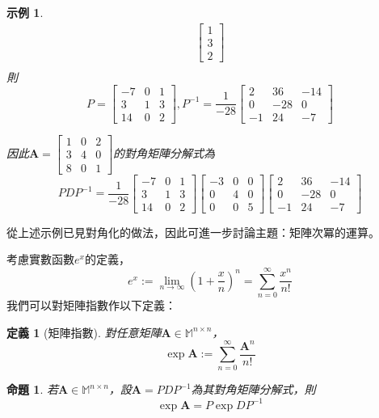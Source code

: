 \documentclass[12pt]{article}
\newtheorem{definition}{定義}
\newtheorem*{proposition}{命題}
\newtheorem*{example}{示例}
\begin{document}
\begin{example}
\begin{align*}
\begin{bmatrix}
                1\\3\\2
            \end{bmatrix}\\
        \end{align*}
        則$$P=\begin{bmatrix}
            -7&0&1\\3&1&3\\14&0&2
        \end{bmatrix},P^{-1}=\frac{1}{-28}\begin{bmatrix}
            2&36&-14\\0&-28&0\\-1&24&-7
        \end{bmatrix}$$

        因此$\mathbf{A}=\begin{bmatrix}
            1&0&2\\3&4&0\\8&0&1
        \end{bmatrix}$的對角矩陣分解式為$$PDP^{-1}=\frac{1}{-28}\begin{bmatrix}
            -7&0&1\\3&1&3\\14&0&2
        \end{bmatrix}\begin{bmatrix}
            -3&0&0\\0&4&0\\0&0&5
        \end{bmatrix}\begin{bmatrix}
            2&36&-14\\0&-28&0\\-1&24&-7
        \end{bmatrix}$$
    \end{example}

    從上述示例已見對角化的做法，因此可進一步討論主題：矩陣次冪的運算。

    考慮實數函數$e^x$的定義，$$e^x:=\lim_{n\to \infty}(1+\frac{x}{n})^n=\sum_{n=0}^{\infty}\frac{x^n}{n!}$$
    我們可以對矩陣指數作以下定義：

    \begin{definition}[矩陣指數]
        對任意矩陣$\mathbf{A}\in\mathbb{M}^{n\times n}$，$$\exp{\mathbf{A}}:=\sum_{n=0}^{\infty}\frac{\mathbf{A}^n}{n!}$$
    \end{definition}

    \begin{proposition}
        若$\mathbf{A}\in\mathbb{M}^{n\times n}$，設$\mathbf{A}=PDP^{-1}$為其對角矩陣分解式，則$$\exp{\mathbf{A}}=P\exp{D}P^{-1}$$
    \end{proposition}
    
\end{document}
